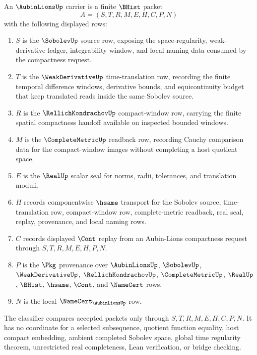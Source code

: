 \begin{definition}
\label{def:aubin-lions-carrier}
An $\AubinLionsUp$ carrier is a finite $\BHist$ packet
$$
A=(S,T,R,M,E,H,C,P,N)
$$
with the following displayed rows:
\begin{enumerate}
\item $S$ is the $\SobolevUp$ source row, exposing the space-regularity, weak-derivative ledger, integrability window, and local naming data consumed by the compactness request.
\item $T$ is the $\WeakDerivativeUp$ time-translation row, recording the finite temporal difference windows, derivative bounds, and equicontinuity budget that keep translated reads inside the same Sobolev source.
\item $R$ is the $\RellichKondrachovUp$ compact-window row, carrying the finite spatial compactness handoff available on inspected bounded windows.
\item $M$ is the $\CompleteMetricUp$ readback row, recording Cauchy comparison data for the compact-window images without completing a host quotient space.
\item $E$ is the $\RealUp$ scalar seal for norms, radii, tolerances, and translation moduli.
\item $H$ records componentwise $\hsame$ transport for the Sobolev source, time-translation row, compact-window row, complete-metric readback, real seal, replay, provenance, and local naming rows.
\item $C$ records displayed $\Cont$ replay from an Aubin-Lions compactness request through $S,T,R,M,E,H,P,N$.
\item $P$ is the $\Pkg$ provenance over $\AubinLionsUp$, $\SobolevUp$, $\WeakDerivativeUp$, $\RellichKondrachovUp$, $\CompleteMetricUp$, $\RealUp$, $\BHist$, $\hsame$, $\Cont$, and $\NameCert$ rows.
\item $N$ is the local $\NameCert_{\AubinLionsUp}$ row.
\end{enumerate}
The classifier compares accepted packets only through $S,T,R,M,E,H,C,P,N$. It has no coordinate for a selected subsequence, quotient function equality, host compact embedding, ambient completed Sobolev space, global time regularity theorem, unrestricted real completeness, Lean verification, or bridge checking.
\end{definition}


